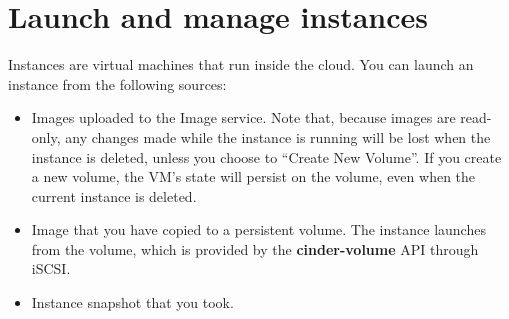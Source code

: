 \chapter{Launch and manage instances}\label{cha:launch-manage-inst}
Instances are virtual machines that run inside the cloud. You can launch
an \gls{instance} from the following sources:

\begin{itemize}
\item Images uploaded to the Image service.  Note that, because images
  are read-only, any changes made while the instance is running will
  be lost when the instance is deleted, unless you choose to ``Create
  New Volume''.  If you create a new volume, the VM's state will
  persist on the volume, even when the current instance is deleted.
  \item Image that you have copied to a persistent volume. The instance
  launches from the volume, which is provided by the
  \textbf{cinder-volume} API through iSCSI.
\item Instance snapshot that you took.
\end{itemize}

